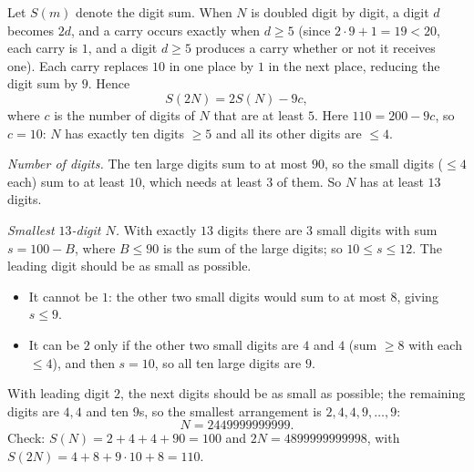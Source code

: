 Let $S(m)$ denote the digit sum. When $N$ is doubled digit by digit, a digit $d$ becomes $2d$, and a carry occurs exactly when $d\ge5$ (since $2\cdot9+1=19<20$, each carry is $1$, and a digit $d\ge5$ produces a carry whether or not it receives one). Each carry replaces $10$ in one place by $1$ in the next place, reducing the digit sum by $9$. Hence
\[
S(2N)=2S(N)-9c,
\]
where $c$ is the number of digits of $N$ that are at least $5$. Here $110=200-9c$, so $c=10$: $N$ has exactly ten digits $\ge5$ and all its other digits are $\le4$.

\emph{Number of digits.} The ten large digits sum to at most $90$, so the small digits ($\le4$ each) sum to at least $10$, which needs at least $3$ of them. So $N$ has at least $13$ digits.

\emph{Smallest $13$-digit $N$.} With exactly $13$ digits there are $3$ small digits with sum $s=100-B$, where $B\le90$ is the sum of the large digits; so $10\le s\le12$. The leading digit should be as small as possible.
\begin{itemize}
\item It cannot be $1$: the other two small digits would sum to at most $8$, giving $s\le9$.
\item It can be $2$ only if the other two small digits are $4$ and $4$ (sum $\ge8$ with each $\le4$), and then $s=10$, so all ten large digits are $9$.
\end{itemize}
With leading digit $2$, the next digits should be as small as possible; the remaining digits are $4,4$ and ten $9$s, so the smallest arrangement is $2,4,4,9,\dots,9$:
\[
N=\boxed{2449999999999}.
\]
Check: $S(N)=2+4+4+90=100$ and $2N=4899999999998$, with $S(2N)=4+8+9\cdot10+8=110$.
